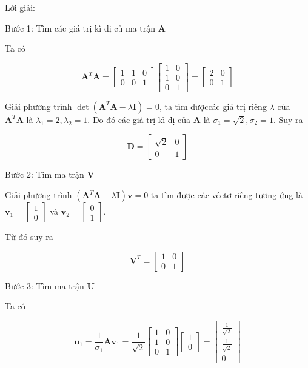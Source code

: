 \documentclass[12pt,a4paper,oneside]{report}
\numberwithin{equation}{section}
\begin{document}
Lời giải:

Bước 1: Tìm các giá trị kì dị củ ma trận $\mathbf{A}$

Ta có

$$
\mathbf{A}^{T} \mathbf{A}=\left[\begin{array}{lll}
	1 & 1 & 0 \\
	0 & 0 & 1
\end{array}\right]\left[\begin{array}{ll}
	1 & 0 \\
	1 & 0 \\
	0 & 1
\end{array}\right]=\left[\begin{array}{ll}
	2 & 0 \\
	0 & 1
\end{array}\right]
$$

Giải phương trình $\operatorname{det}\left(\mathbf{A}^{T} \mathbf{A}-\lambda \mathbf{I}\right)=0$, ta tìm đượccác giá trị riêng $\lambda$ của $\mathbf{A}^{T} \mathbf{A}$ là $\lambda_{1}=2, \lambda_{2}=1$. Do đó các giá trị kì dị của $\mathbf{A}$ là $\sigma_{1}=\sqrt{2}, \sigma_{2}=1$. Suy ra

$$
\mathbf{D}=\left[\begin{array}{cc}
	\sqrt{2} & 0 \\
	0 & 1
\end{array}\right]
$$

Bước 2: Tìm ma trận $\mathbf{V}$

Giải phương trình $\left(\mathbf{A}^{T} \mathbf{A}-\lambda \mathbf{I}\right) \mathbf{v}=0$ ta tìm được các véctơ riêng tương ứng là \\
$\mathbf{v}_{1}=\left[\begin{array}{l}1 \\ 0\end{array}\right]$ và $\mathbf{v}_{2}=\left[\begin{array}{l}0 \\ 1\end{array}\right]$.

Từ đó suy ra

$$
\mathbf{V}^{T}=\left[\begin{array}{ll}
	1 & 0 \\
	0 & 1
\end{array}\right]
$$

Bước 3: Tìm ma trận $\mathbf{U}$

Ta có

$$
\mathbf{u}_{1}=\frac{1}{\sigma_{1}} \mathbf{A} \mathbf{v}_{1}=\frac{1}{\sqrt{2}}\left[\begin{array}{ll}
	1 & 0 \\
	1 & 0 \\
	0 & 1
\end{array}\right]\left[\begin{array}{l}
	1 \\
	0
\end{array}\right]=\left[\begin{array}{c}
	\frac{1}{\sqrt{2}} \\
	\frac{1}{\sqrt{2}} \\
	0
\end{array}\right]
$$
\end{document}
